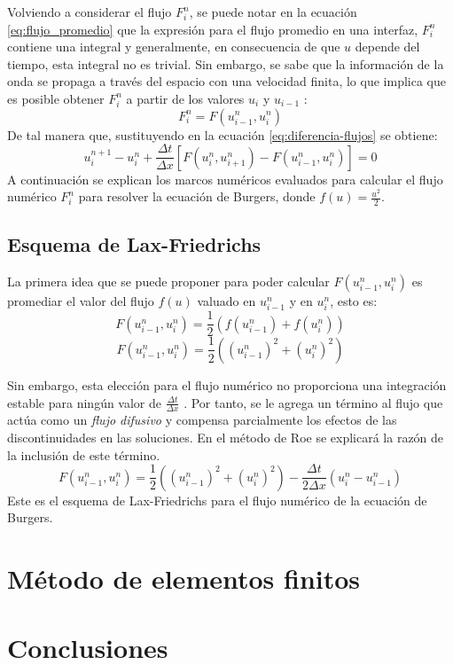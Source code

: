 \documentclass[12pt]{article}
\begin{document}
	Volviendo a considerar el flujo $F_{i}^{n}$, se puede notar en la ecuación \ref{eq:flujo_promedio} que la expresión para el flujo promedio en una interfaz, $F_{i}^{n}$ contiene una integral y generalmente, en consecuencia de que $u$ depende del tiempo, esta integral no es trivial. Sin embargo, se sabe que la información de la onda se propaga a través del espacio con una velocidad finita, lo que implica que es posible obtener $F_{i}^{n}$ a partir de los valores $u_i$ y $u_{i-1}$ \cite{LeVeque1998}:
	\begin{equation}
		F_{i}^{n} = F(u_{i-1}^{n}, u_{i}^{n})
	\end{equation}
	De tal manera que, sustituyendo en la ecuación \ref{eq:diferencia-flujos} se obtiene:
	\begin{equation}
		u_{i}^{n+1} - u_{i}^{n} + \frac{\Delta t}{\Delta x}\left[ F(u_{i}^{n}, u_{i+1}^{n}) - F(u_{i-1}^{n}, u_{i}^{n})\right] = 0
	\end{equation}
	A continuación se explican los marcos numéricos evaluados para calcular el flujo numérico $F_{i}^{n}$ para resolver la ecuación de Burgers, donde $f(u)=\frac{u^2}{2}$.
	
	\subsection{Esquema de Lax-Friedrichs}
	La primera idea que se puede proponer para poder calcular $F(u_{i-1}^{n}, u_{i}^{n})$ es promediar el valor del flujo $f(u)$ valuado en $u_{i-1}^{n}$ y en $u_{i}^{n}$, esto es:
	\begin{equation}
		F(u_{i-1}^{n}, u_{i}^{n}) = \frac{1}{2} \left( f(u_{i-1}^{n}) + f(u_{i}^{n})\right) 
	\end{equation}
	\begin{equation}
		F(u_{i-1}^{n}, u_{i}^{n}) = \frac{1}{2} \left( (u_{i-1}^{n})^2 + (u_{i}^{n})^2 \right) 
	\end{equation}
	
	Sin embargo, esta elección para el flujo numérico no proporciona una integración estable para ningún valor de $\frac{\Delta t}{\Delta x}$ \cite{LeVeque1998}. Por tanto, se le agrega un término al flujo que actúa como un \textit{flujo difusivo} y compensa parcialmente los efectos de las discontinuidades en las soluciones. En el método de Roe se explicará la razón de la inclusión de este término.
	\begin{equation}
		{\boxed{F(u_{i-1}^{n}, u_{i}^{n}) = \frac{1}{2} \left( (u_{i-1}^{n})^2 + (u_{i}^{n})^2 \right)  - \frac{\Delta t}{2\Delta x}(u_{i}^{n}-u_{i-1}^{n})} }
	\end{equation}
	Este es el esquema de Lax-Friedrichs para el flujo numérico de la ecuación de Burgers.
	\section{Método de elementos finitos}
	\section{Conclusiones}
	
	\printbibliography
	
\end{document}
